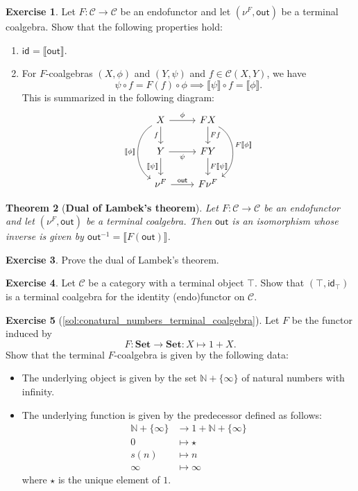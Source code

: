 \documentclass[a4paper,11pt, oneside,titlepage=false]{scrbook}
\theoremstyle{plain}
\newtheorem{thm}{Theorem}
\theoremstyle{definition}
\newtheorem{exer}[thm]{Exercise}
\newcommand{\cfont}[1]{\ensuremath{\mathsf{#1}}}
\newcommand{\Cat}[1]{\mathcal{#1}}
\newcommand{\CC}{\Cat{C}}
\newcommand{\Catb}[1]{\mathbf{#1}}
\newcommand{\SET}{\Catb{Set}}
\newcommand{\CHom}[3]{{#1}(#2,#3)}
\newcommand{\Id}[1][]{\cfont{id}_{#1}}
\newcommand{\Terminalcoalg}[1]{\ensuremath{\nu^{#1}}}
\newcommand{\Inv}[1]{#1 ^{-1}}
\newcommand{\anam}[1]{\llbracket #1 \rrbracket} %
\newcommand{\Out}{\ensuremath{\mathsf{out}}}
\newcommand{\co}[2]{\ensuremath{#2 \circ #1}}
\begin{document}
\begin{exer} Let $F:\CC\to\CC$ be an endofunctor and let $(\Terminalcoalg{F}, \Out)$ be a terminal coalgebra. Show that the following properties hold:
\begin{enumerate}
\item $\Id = \anam{\Out}$.
\item For $F$-coalgebras $(X,\phi)$ and $(Y,\psi)$ and $f\in\CHom{\CC}{X}{Y}$, we have
\[
  \co f \psi   = \co \phi {F(f)} \implies \co{f}{\anam{\psi}} = \anam{\phi}.
\]
This is summarized in the following diagram:
\[
\begin{tikzcd}
X
\arrow[r, "\phi"]
\arrow[d,swap, "f"]
\ar[dd, "\anam{\phi}"', bend right = 60]
&
FX
\arrow[d, "Ff"]
\ar[dd, "F\anam{\phi}", bend left = 60]
\\
Y
\arrow[r, swap, "\psi"]
\ar[d, "\anam{\psi}"']
&
FY
\ar[d, "F\anam{\psi}"]
\\
\Terminalcoalg{F}
\ar[r, "\Out"]
&
F\Terminalcoalg{F}
\end{tikzcd}
\]
\end{enumerate}
\end{exer}

\begin{thm}[\textbf{Dual of Lambek's theorem}] Let $F:\CC\to\CC$ be an endofunctor and let $(\Terminalcoalg{F}, \Out)$ be a terminal coalgebra. Then $\Out$ is an isomorphism whose inverse is given by $\Inv{\Out} = \anam{F(\Out)}$.
\end{thm}

\begin{exer}
  Prove the dual of Lambek's theorem.
\end{exer}

\begin{exer}\label{exer:terminalalg_for_idfun_with_terminalob} Let $\CC$ be a category with a terminal object $\top$. Show that $(\top, \Id[\top])$ is a terminal coalgebra for the identity (endo)functor on $\CC$.
\end{exer}

\begin{exer}[\cref{sol:conatural_numbers_terminal_coalgebra}] \label{exer:conatural_numbers_terminal_coalgebra} Let $F$ be the functor induced by
\[
F:\SET\to\SET : X\mapsto 1 + X.
\]
Show that the terminal $F$-coalgebra is given by the following data:
\begin{itemize}
\item The underlying object is given by the set $\mathbb{N} + \{\infty\}$ of natural numbers with infinity.
\item The underlying function is given by the predecessor defined as follows:
\begin{align*}
  \mathbb{N} + \{\infty\} &\to 1 + \mathbb{N} + \{\infty\}
  \\
  0 &\mapsto \star
  \\
  s(n) &\mapsto n
  \\
  \infty &\mapsto \infty
\end{align*}
where $\star$ is the unique element of $1$.
\end{itemize}
\end{exer}
\end{document}
